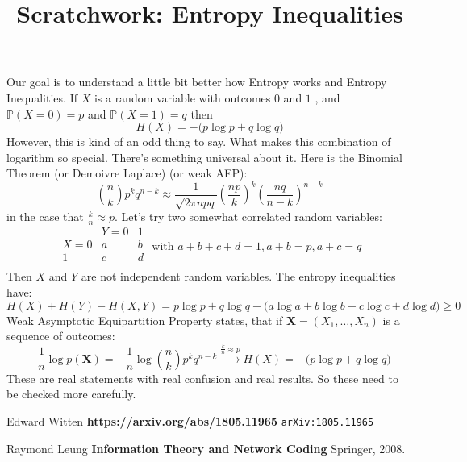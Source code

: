 \documentclass[12pt]{article}
\title{Scratchwork: Entropy Inequalities}
\date{}
\begin{document}
\sffamily

\maketitle

\noindent Our goal is to understand a little bit better how Entropy works and Entropy Inequalities.  If $X$ is a random variable with outcomes $0$ and $1$ , and $\mathbb{P}(X=0) = p$ and $\mathbb{P}(X=1) = q$ then
$$ H(X) = - \big( p \log p + q \log q \big) $$
However, this is kind of an odd thing to say.  What makes this combination of logarithm so special.  There's something universal about it.  Here is the Binomial Theorem (or Demoivre Laplace) (or weak AEP):
$$ \binom{n}{k} p^k q^{n-k}  \approx 
\frac{1}{\sqrt{2\pi n pq}} \left( \frac{np}{k}\right)^k \left( \frac{nq}{n-k}\right)^{n-k} $$
in the case that $\frac{k}{n} \approx p$. Let's try two somewhat correlated random variables:
$$
\begin{array}{r|cc} 
 & Y=0 & 1 \\ \hline
X=0 & a & b \\
1 & c & d \\
\end{array} \text{ with }a+b+c+d=1,a+b=p,a+c=q$$
Then $X$ and $Y$ are not independent random variables.  The entropy inequalities have:
$$
H(X)+H(Y) - H(X,Y) = 
p \log p + q \log q - \big( a \log a + b \log b + c \log c + d \log d \big) \geq 0 $$ 
Weak Asymptotic Equipartition Property states, that if $\mathbf{X}=(X_1, \dots, X_n)$ is a sequence of outcomes: 
$$ - \frac{1}{n} \log p(\mathbf{X}) 
= - \frac{1}{n}\log \binom{n}{k} p^k q^{n-k} \stackrel{\frac{k}{n} \approx p }{\longrightarrow} H(X) = - \big( p  \log p + q \log q \big) $$
These are real statements with real confusion and real results.  So these need to be checked more carefully.
\vfill
\begin{thebibliography}{}

\item Edward Witten \textbf{https://arxiv.org/abs/1805.11965} \texttt{arXiv:1805.11965} 
\item Raymond Leung \textbf{Information Theory and Network Coding} Springer, 2008.

\end{thebibliography}
\end{document}
